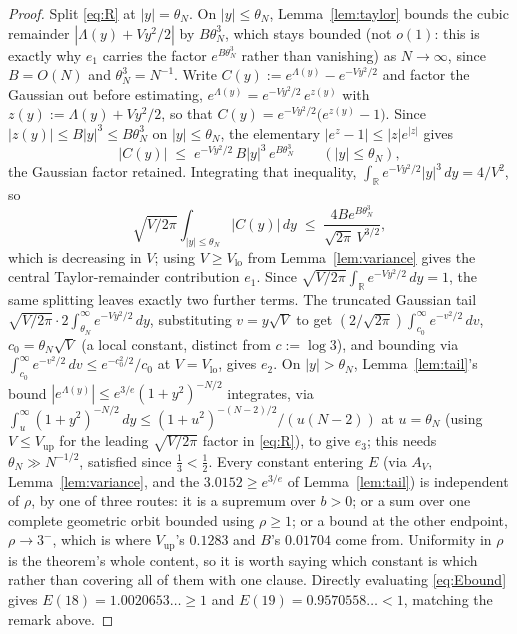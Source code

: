 \documentclass[11pt]{article}
\theoremstyle{definition}
\theoremstyle{remark}
\newcommand{\R}{\mathbb{R}}
\begin{document}
\begin{proof}
Split \eqref{eq:R} at $|y|=\theta_N$. On $|y|\le\theta_N$, Lemma~\ref{lem:taylor} bounds the cubic
remainder $|\Lambda(y)+Vy^2/2|$ by $B\theta_N^3$, which stays bounded (not $o(1)$: this is exactly
why $e_1$ carries the factor $e^{B\theta_N^3}$ rather than vanishing) as $N\to\infty$, since $B=O(N)$
and $\theta_N^3=N^{-1}$. Write $C(y):=e^{\Lambda(y)}-e^{-Vy^2/2}$ and factor the Gaussian out
before estimating, $e^{\Lambda(y)} = e^{-Vy^2/2}\,e^{z(y)}$ with $z(y) := \Lambda(y)+Vy^2/2$, so
that $C(y) = e^{-Vy^2/2}\bigl(e^{z(y)}-1\bigr)$. Since $|z(y)|\le B|y|^3 \le B\theta_N^3$ on
$|y|\le\theta_N$, the elementary $|e^z-1|\le|z|e^{|z|}$ gives
\[
|C(y)| \;\le\; e^{-Vy^2/2}\,B|y|^3\,e^{B\theta_N^3} \qquad (|y|\le\theta_N),
\]
the Gaussian factor retained. Integrating that inequality, $\int_\R e^{-Vy^2/2}|y|^3\,dy=4/V^2$, so
\[
\sqrt{V/2\pi}\int_{|y|\le\theta_N}|C(y)|\,dy \;\le\; \frac{4Be^{B\theta_N^3}}{\sqrt{2\pi}\,V^{3/2}},
\]
which is decreasing in $V$; using $V\ge V_{\mathrm{lo}}$ from Lemma~\ref{lem:variance} gives the
central Taylor-remainder contribution $e_1$. Since $\sqrt{V/2\pi}\int_\R e^{-Vy^2/2}\,dy = 1$, the
same splitting leaves exactly two further terms. The truncated Gaussian tail
$\sqrt{V/2\pi}\cdot2\int_{\theta_N}^\infty e^{-Vy^2/2}\,dy$, substituting $v=y\sqrt V$ to get
$(2/\sqrt{2\pi})\int_{c_0}^\infty e^{-v^2/2}\,dv$, $c_0=\theta_N\sqrt V$ (a local constant, distinct
from $c:=\log3$), and bounding via $\int_{c_0}^\infty e^{-v^2/2}\,dv\le e^{-c_0^2/2}/c_0$ at
$V=V_{\mathrm{lo}}$, gives $e_2$. On
$|y|>\theta_N$, Lemma~\ref{lem:tail}'s bound
$|e^{\Lambda(y)}|\le e^{3/e}(1+y^2)^{-N/2}$ integrates, via $\int_u^\infty(1+y^2)^{-N/2}\,dy \le
(1+u^2)^{-(N-2)/2}/(u(N-2))$ at $u=\theta_N$ (using $V\le V_{\mathrm{up}}$ for the leading
$\sqrt{V/2\pi}$ factor in \eqref{eq:R}), to give $e_3$; this needs $\theta_N \gg N^{-1/2}$, satisfied
since $\tfrac13<\tfrac12$. Every constant entering $E$ (via $A_V$, Lemma~\ref{lem:variance}, and the
$3.0152\ge e^{3/e}$ of Lemma~\ref{lem:tail}) is independent of $\rho$, by one of three routes: it
is a supremum over $b>0$; or a sum over one complete geometric orbit bounded using $\rho\ge1$; or
a bound at the other endpoint, $\rho\to3^-$, which is where $V_{\mathrm{up}}$'s $0.1283$ and $B$'s
$0.01704$ come from. Uniformity in $\rho$ is the theorem's whole content, so it is worth saying
which constant is which rather than covering all of them with one clause. Directly evaluating
\eqref{eq:Ebound} gives $E(18) = 1.0020653\ldots \ge 1$ and $E(19) = 0.9570558\ldots < 1$, matching the
remark above.


\end{proof}
\end{document}
